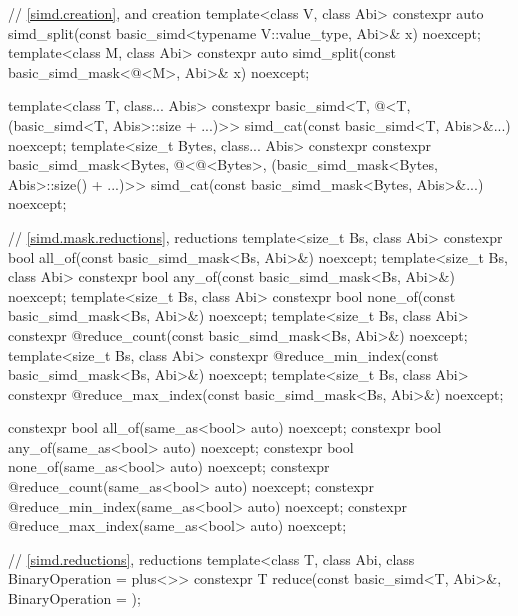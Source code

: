 \begin{codeblock}
{  // \ref{simd.creation},  and  creation
  template<class V, class Abi>
    constexpr auto
      simd_split(const basic_simd<typename V::value_type, Abi>& x) noexcept;
  template<class M, class Abi>
    constexpr auto
      simd_split(const basic_simd_mask<@\maskelementsize@<M>, Abi>& x) noexcept;

  template<class T, class... Abis>
    constexpr basic_simd<T, @\deducet@<T, (basic_simd<T, Abis>::size + ...)>>
      simd_cat(const basic_simd<T, Abis>&...) noexcept;
  template<size_t Bytes, class... Abis>
    constexpr constexpr basic_simd_mask<Bytes, @\deducet@<@\integerfrom@<Bytes>, (basic_simd_mask<Bytes, Abis>::size() + ...)>>
      simd_cat(const basic_simd_mask<Bytes, Abis>&...) noexcept;

  // \ref{simd.mask.reductions},  reductions
  template<size_t Bs, class Abi>
    constexpr bool all_of(const basic_simd_mask<Bs, Abi>&) noexcept;
  template<size_t Bs, class Abi>
    constexpr bool any_of(const basic_simd_mask<Bs, Abi>&) noexcept;
  template<size_t Bs, class Abi>
    constexpr bool none_of(const basic_simd_mask<Bs, Abi>&) noexcept;
  template<size_t Bs, class Abi>
    constexpr @\simdsizetype@ reduce_count(const basic_simd_mask<Bs, Abi>&) noexcept;
  template<size_t Bs, class Abi>
    constexpr @\simdsizetype@ reduce_min_index(const basic_simd_mask<Bs, Abi>&) noexcept;
  template<size_t Bs, class Abi>
    constexpr @\simdsizetype@ reduce_max_index(const basic_simd_mask<Bs, Abi>&) noexcept;

  constexpr bool all_of(same_as<bool> auto) noexcept;
  constexpr bool any_of(same_as<bool> auto) noexcept;
  constexpr bool none_of(same_as<bool> auto) noexcept;
  constexpr @\simdsizetype@ reduce_count(same_as<bool> auto) noexcept;
  constexpr @\simdsizetype@ reduce_min_index(same_as<bool> auto) noexcept;
  constexpr @\simdsizetype@ reduce_max_index(same_as<bool> auto) noexcept;

  // \ref{simd.reductions},  reductions
  template<class T, class Abi, class BinaryOperation = plus<>>
    constexpr T reduce(const basic_simd<T, Abi>&, BinaryOperation = {});

}
\end{codeblock}
